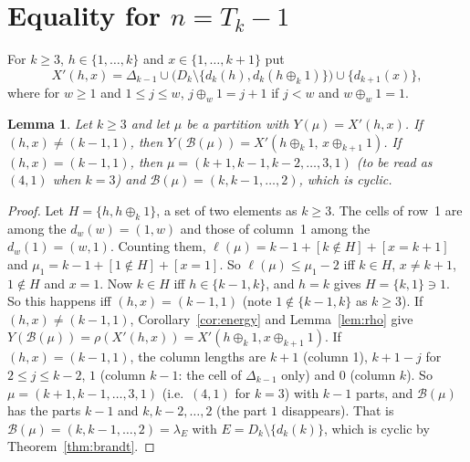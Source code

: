 \documentclass[11pt]{article}
\newtheorem{lemma}[theorem]{Lemma}
\theoremstyle{definition}
\newcommand{\B}{\mathcal{B}}
\renewcommand{\le}{\leqslant}
\renewcommand{\ge}{\geqslant}
\begin{document}
\section{Equality for $n=T_k-1$}\label{sec:c3lower}

For $k\ge3$, $h\in\{1,\dots,k\}$ and $x\in\{1,\dots,k+1\}$ put
\[X'(h,x)=\Delta_{k-1}\cup\bigl(D_k\setminus\{d_k(h),d_k(h\oplus_k1)\}\bigr)\cup\{d_{k+1}(x)\},\]
where for $w\ge1$ and $1\le j\le w$, $j\oplus_w1=j+1$ if $j<w$ and $w\oplus_w1=1$.

\begin{lemma}\label{lem:c3conf}
Let $k\ge3$ and let $\mu$ be a partition with $Y(\mu)=X'(h,x)$.  If $(h,x)\ne(k-1,1)$, then
$Y(\B(\mu))=X'(h\oplus_k1,\,x\oplus_{k+1}1)$.  If $(h,x)=(k-1,1)$, then $\mu=(k+1,k-1,k-2,\dots,3,1)$ (to be read as $(4,1)$ when $k=3$) and
$\B(\mu)=(k,k-1,\dots,2)$, which is cyclic.
\end{lemma}
\begin{proof}
Let $H=\{h,h\oplus_k1\}$, a set of two elements as $k\ge3$.  The cells of row~1 are among the
$d_w(w)=(1,w)$ and those of column~1 among the $d_w(1)=(w,1)$.  Counting them,
$\ell(\mu)=k-1+[k\notin H]+[x=k+1]$ and $\mu_1=k-1+[1\notin H]+[x=1]$.  So
$\ell(\mu)\le\mu_1-2$ iff $k\in H$, $x\ne k+1$, $1\notin H$ and $x=1$.  Now $k\in H$ iff $h\in\{k-1,k\}$, and
$h=k$ gives $H=\{k,1\}\ni1$.  So this happens iff $(h,x)=(k-1,1)$ (note $1\notin\{k-1,k\}$ as $k\ge3$).  If
$(h,x)\ne(k-1,1)$, Corollary~\ref{cor:energy} and Lemma~\ref{lem:rho} give $Y(\B(\mu))=\rho(X'(h,x))=
X'(h\oplus_k1,x\oplus_{k+1}1)$.  If $(h,x)=(k-1,1)$, the column lengths are $k+1$ (column 1), $k+1-j$ for
$2\le j\le k-2$, $1$ (column $k-1$: the cell of $\Delta_{k-1}$ only) and $0$ (column $k$).  So
$\mu=(k+1,k-1,\dots,3,1)$ (i.e.\ $(4,1)$ for $k=3$) with $k-1$ parts, and $\B(\mu)$ has the parts $k-1$ and $k,k-2,\dots,2$ (the
part $1$ disappears).  That is $\B(\mu)=(k,k-1,\dots,2)=\lambda_E$ with $E=D_k\setminus\{d_k(k)\}$, which is
cyclic by Theorem~\ref{thm:brandt}.
\end{proof}
\end{document}

